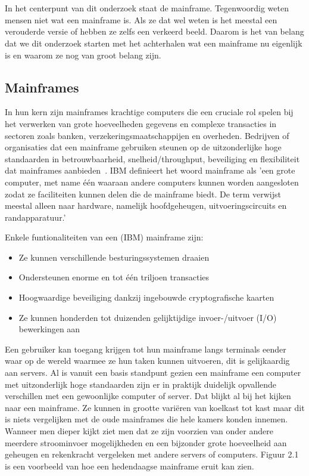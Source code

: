 \chapter{}%
\label{ch:stand-van-zaken}


In het centerpunt van dit onderzoek staat de mainframe. Tegenwoordig weten mensen niet wat een mainframe is. Als ze dat wel weten is het meestal een verouderde versie of hebben ze zelfs een verkeerd beeld. Daarom is het van belang dat we dit onderzoek starten met het achterhalen wat een mainframe nu eigenlijk is en waarom ze nog van groot belang zijn.

\section{Mainframes}
In hun kern zijn mainframes krachtige computers die een cruciale rol spelen bij het verwerken van grote hoeveelheden gegevens en complexe transacties in sectoren zoals banken, verzekeringsmaatschappijen en overheden. Bedrijven of organisaties dat een mainframe gebruiken steunen op de uitzonderlijke hoge standaarden in betrouwbaarheid, snelheid/throughput, beveiliging en flexibiliteit dat mainframes aanbieden~\autocite{IBM2023(1),IBM2023(2)}. IBM definieert het woord mainframe als 'een grote computer, met name één waaraan andere computers kunnen worden aangesloten zodat ze faciliteiten kunnen delen die de mainframe biedt. De term verwijst meestal alleen naar hardware, namelijk hoofdgeheugen, uitvoeringscircuits en randapparatuur.'~\autocite{IBMArchives}

Enkele funtionaliteiten van een (IBM) mainframe zijn:

\begin{itemize}
    \item Ze kunnen verschillende besturingssystemen draaien
    \item Ondersteunen enorme en tot één triljoen transacties
    \item Hoogwaardige beveiliging dankzij ingebouwde cryptografische kaarten
    \item Ze kunnen honderden tot duizenden gelijktijdige invoer-/uitvoer (I/O) bewerkingen aan
\end{itemize}
 
Een gebruiker kan toegang krijgen tot hun mainframe langs terminals eender waar op de wereld waarmee ze hun taken kunnen uitvoeren, dit is gelijkaardig aan servers. Al is vanuit een basis standpunt gezien een mainframe een computer met uitzonderlijk hoge standaarden zijn er in praktijk duidelijk opvallende verschillen met een gewoonlijke computer of server. Dat blijkt al bij het kijken naar een mainframe. Ze kunnen in grootte variëren van koelkast tot kast maar dit is niets vergelijken met de oude mainframes die hele kamers konden innemen. Wanneer men dieper kijkt ziet men dat ze zijn voorzien van onder andere meerdere stroominvoer mogelijkheden en een bijzonder grote hoeveelheid aan geheugen en rekenkracht vergeleken met andere servers of computers. Figuur 2.1 is een voorbeeld van hoe een hedendaagse mainframe eruit kan zien.~\autocite{ChristopherTozzi}


